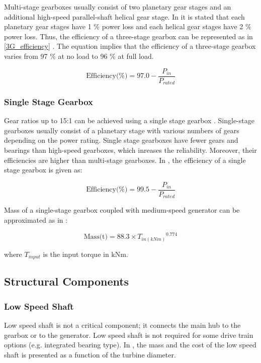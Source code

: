\documentclass{article}
\begin{document}
Multi-stage gearboxes usually consist of two planetary gear stages and an additional high-speed parallel-shaft helical gear stage. In \cite{Hau2005a} it is stated that each planetary gear stages have 1 \% power loss and each helical gear stages have 2 \% power loss. Thus, the efficiency of a three-stage gearbox can be represented as in \autoref{3G_efficiency} \cite{Zhang2011a}. The equation implies that the efficiency of a three-stage gearbox varies from 97 \% at no load to 96 \% at full load.

\begin{equation}
  \text{Efficiency(\%)} = 97.0 - \dfrac{P_{in}}{P_{rated}}
  \label{3G_efficiency}
\end{equation}

\subsubsection{Single Stage Gearbox}

Gear ratios up to 15:1 can be achieved using a single stage gearbox \cite{Cotrell2002}. Single-stage gearboxes usually consist of a planetary stage with various numbers of gears depending on the power rating. Single stage gearboxes have fewer gears and bearings than high-speed gearboxes, which inreases the reliability. Moreover, their efficiencies are higher than multi-stage gearboxes. In \cite{Matveev2011}, the efficiency of a single stage gearbox is given as:

\begin{equation}
  \text{Efficiency(\%)} = 99.5 - \dfrac{P_{in}}{P_{rated}}
\end{equation}

Mass of a single-stage gearbox coupled with medium-speed generator can be approximated as in \cite{Fingersh2006}:

\begin{equation}
	\text{Mass(t)} = 88.3 \times {T_{in(kNm)}}^{0.774}
\end{equation}

where $T_{input}$ is the input torque in kNm.


\subsection{Structural Components}

\subsubsection{Low Speed Shaft}
Low speed shaft is not a critical component; it connects the main hub to the gearbox or to the generator. Low speed shaft is not required for some drive train options (e.g. integrated bearing type). In \cite{Fingersh2006}, the mass and the cost of the low speed shaft is presented as a function of the turbine diameter.
\end{document}
